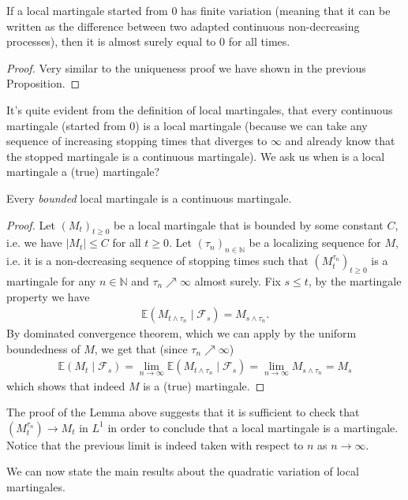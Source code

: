 \documentclass[../mainfile.tex]{subfiles}
\begin{document}
\begin{lem} If a local martingale started from $0$ has finite variation (meaning that it can be written as the difference between two adapted continuous non-decreasing processes), then it is almost surely equal to $0$ for all times. 
\end{lem}
\begin{proof}
Very similar to the uniqueness proof we have shown in the previous Proposition. 
\end{proof}
It's quite evident from the definition of local martingales, that every continuous martingale (started from $0$) is a local martingale (because we can take any sequence of increasing stopping times that diverges to $\infty$ and already know that the stopped martingale is a continuous martingale). We ask us when is a local martingale a (true) martingale?
\begin{lem} Every \textit{bounded} local martingale is a continuous martingale.  
\end{lem}
\begin{proof}
Let $(M_t)_{t \geq 0}$ be a local martingale that is bounded by some constant $C$, i.e. we have $|M_t| \leq C$ for all $t \geq 0$. Let $(\tau_n)_{n \in \mathbb{N}}$ be a localizing sequence for $M$, i.e. it is a non-decreasing sequence of stopping times such that $(M_t^{\tau_n})_{t \geq 0}$ is a martingale for any $n \in \mathbb{N}$ and $\tau_n \nearrow \infty$ almost surely. Fix $s \leq t$,  by the martingale property we have 
\begin{align*}
\mathbb{E}(M_{t \wedge \tau_n} \mid \mathcal{F}_s) = M_{s \wedge \tau_n}.
\end{align*}
By dominated convergence theorem, which we can apply by the uniform boundedness of $M$, we get that (since $\tau_n \nearrow \infty$) 
\begin{align*}
\mathbb{E}(M_t \mid \mathcal{F}_s) = \lim_{n \to \infty} \mathbb{E}(M_{t \wedge \tau_n} \mid \mathcal{F}_s) = \lim_{n \to \infty} M_{s \wedge \tau_n} = M_s 
\end{align*}
which shows that indeed $M$ is a (true) martingale. 
\end{proof}
\begin{rem} The proof of the Lemma above suggests that it is sufficient to check that $(M_t^{\tau_n}) \to M_t$ in $L^1$ in order to conclude that a local martingale is a martingale. Notice that the previous limit is indeed taken with respect to $n$ as $n \to \infty$. 
\end{rem}
\newpage
We can now state the main results about the quadratic variation of local martingales.
\end{document}
